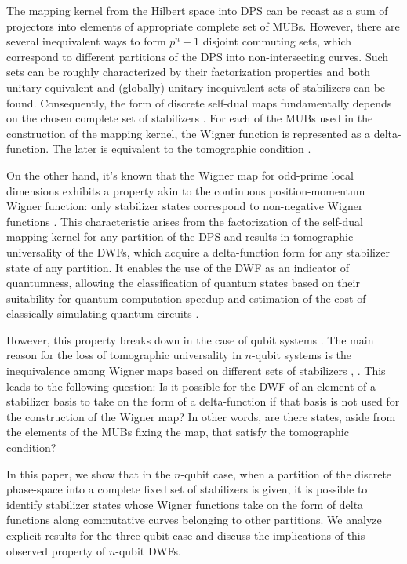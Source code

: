 \documentclass{article}
\begin{document}
The mapping kernel from the Hilbert space into DPS can be recast as a sum of
projectors into elements of appropriate complete set of MUBs. However, there
are several inequivalent ways to form $p^{n}+1$ disjoint commuting sets,
which correspond to different partitions of the DPS into non-intersecting
curves. Such sets can be roughly characterized by their factorization
properties and both unitary equivalent and (globally) unitary inequivalent
sets of stabilizers can be found. Consequently, the form of discrete
self-dual maps fundamentally depends on the chosen complete set of
stabilizers \cite{Bjork2007}. For each of the MUBs used in the construction
of the mapping kernel, the Wigner function is represented as a
delta-function. The later is equivalent to the tomographic condition \cite%
{gibbons,galvao,cormick,DFW11,DFW12}.

On the other hand, it's known that the Wigner map for odd-prime local
dimensions exhibits a property akin to the continuous position-momentum
Wigner function: only stabilizer states correspond to non-negative Wigner
functions \cite{gross}. This characteristic arises from the factorization of
the self-dual mapping kernel for any partition of the DPS and results in
tomographic universality of the DWFs, which acquire a delta-function form
for any stabilizer state of any partition. It enables the use of the DWF as
an indicator of quantumness, allowing the classification of quantum states
based on their suitability for quantum computation speedup and estimation of
the cost of classically simulating quantum circuits \cite{Raus17,UniqueWF,
cohomo, contextMagic, WignerContext}.

However, this property breaks down in the case of qubit systems \cite{
UniqueWF, cohomo,contextMagic}. The main reason for the loss of tomographic
universality in $n$-qubit systems is the inequivalence among Wigner maps
based on different sets of stabilizers \cite{Bjork2007}, \cite{qip17}. This
leads to the following question: Is it possible for the DWF of an element of
a stabilizer basis to take on the form of a delta-function if that basis is
not used for the construction of the Wigner map? In other words, are there
states, aside from the elements of the MUBs fixing the map, that satisfy the
tomographic condition?

In this paper, we show that in the $n$-qubit case, when a partition of the
discrete phase-space into a complete fixed set of stabilizers is given, it
is possible to identify stabilizer states whose Wigner functions take on the
form of delta functions along commutative curves belonging to other
partitions. We analyze explicit results for the three-qubit case and discuss
the implications of this observed property of $n$-qubit DWFs.
\end{document}
